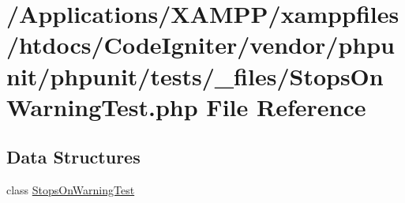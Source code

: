 \hypertarget{_stops_on_warning_test_8php}{}\section{/\+Applications/\+X\+A\+M\+P\+P/xamppfiles/htdocs/\+Code\+Igniter/vendor/phpunit/phpunit/tests/\+\_\+files/\+Stops\+On\+Warning\+Test.php File Reference}
\label{_stops_on_warning_test_8php}
\subsection*{Data Structures}
\begin{DoxyCompactItemize}
\item 
class \mbox{\hyperlink{class_stops_on_warning_test}{Stops\+On\+Warning\+Test}}
\end{DoxyCompactItemize}
